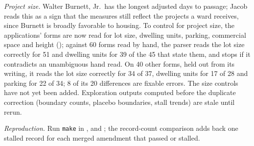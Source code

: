 \textit{Project size.} Walter Burnett, Jr.\ has the longest adjusted days to passage; Jacob reads this as a sign
that the measures still reflect the projects a ward receives, since Burnett is broadly favorable to housing. To
control for project size, the applications' forms are now read for lot size, dwelling units, parking, commercial
space and height (); against 60 forms read by hand, the parser reads
the lot size correctly for 51 and dwelling units for 39 of the 45 that state them, and stops if it contradicts an
unambiguous hand read. On 40 other forms, held out from its writing, it reads the lot size correctly for 34 of 37,
dwelling units for 17 of 28 and parking for 22 of 34; 8 of its 20 differences are fixable errors. The size controls
have not yet been added. Exploration outputs computed before the duplicate correction (boundary counts, placebo
boundaries, stall trends) are stale until rerun.

\textit{Reproduction.} Run \texttt{make} in ,
 and ; the record-count
comparison adds back one stalled record for each merged amendment that passed or stalled.
